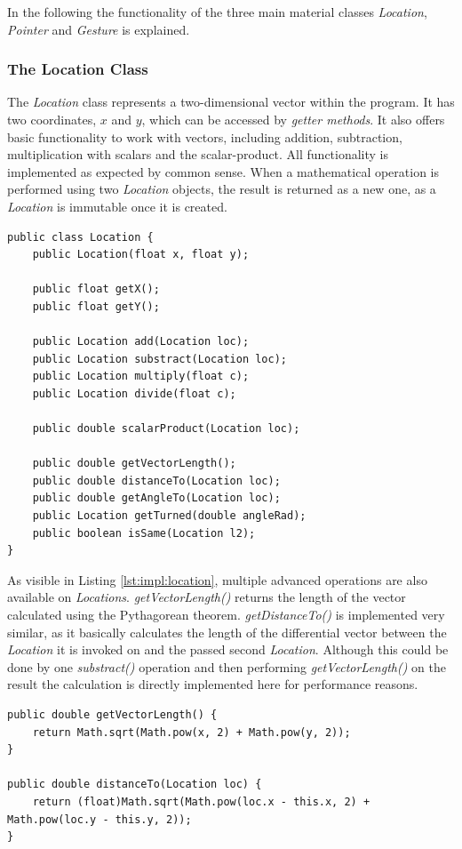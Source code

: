 In the following the functionality of the three main material classes \textit{Location}, \textit{Pointer} and \textit{Gesture} is explained.

\subsubsection{The Location Class}

The \textit{Location} class represents a two-dimensional vector within the program. It has two coordinates, $x$ and $y$, which can be accessed by \textit{getter methods}. It also offers basic functionality to work with vectors, including addition, subtraction, multiplication with scalars and the scalar-product. All functionality is implemented as expected by common sense. When a mathematical operation is performed using two \textit{Location} objects, the result is returned as a new one, as a \textit{Location} is immutable once it is created.

\begin{lstlisting}[caption={The public interface of the Location class}, label=lst:impl:location]
public class Location {
	public Location(float x, float y);
	
	public float getX();
	public float getY();
	
	public Location add(Location loc);
	public Location substract(Location loc);
	public Location multiply(float c);
	public Location divide(float c);
	
	public double scalarProduct(Location loc);
	
	public double getVectorLength();
	public double distanceTo(Location loc);
	public double getAngleTo(Location loc);
	public Location getTurned(double angleRad);
	public boolean isSame(Location l2);
}
\end{lstlisting}

As visible in Listing \ref{lst:impl:location}, multiple advanced operations are also available on \textit{Locations}. \textit{getVectorLength()} returns the length of the vector calculated using the Pythagorean theorem. \textit{getDistanceTo()} is implemented very similar, as it basically calculates the length of the differential vector between the \textit{Location} it is invoked on and the passed second \textit{Location}. Although this could be done by one \textit{substract()} operation and then performing \textit{getVectorLength()} on the result the calculation is directly implemented here for performance reasons.

\begin{lstlisting}[caption={Implementation of getVectorLength() and getDistanceTo()},label=lst:impl:location_length]
public double getVectorLength() {
	return Math.sqrt(Math.pow(x, 2) + Math.pow(y, 2));
}

public double distanceTo(Location loc) {
	return (float)Math.sqrt(Math.pow(loc.x - this.x, 2) + Math.pow(loc.y - this.y, 2));
}
\end{lstlisting}


